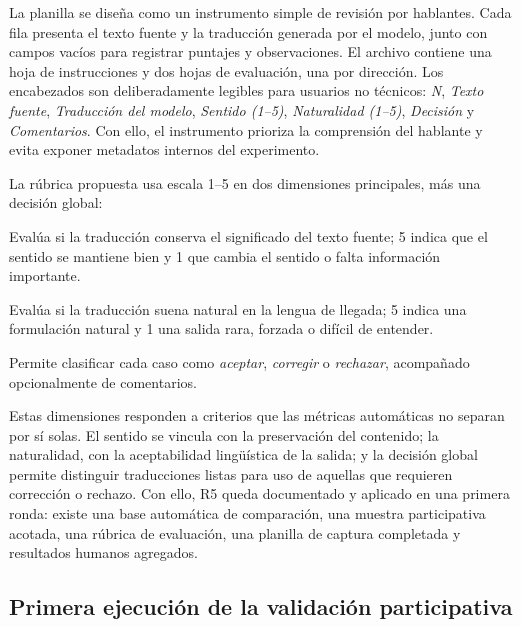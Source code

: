 \documentclass[12pt,a4paper,oneside]{book}
\begin{document}
La planilla se diseña como un instrumento simple de revisión por hablantes. Cada fila presenta el texto fuente y la traducción generada por el modelo, junto con campos vacíos para registrar puntajes y observaciones. El archivo contiene una hoja de instrucciones y dos hojas de evaluación, una por dirección. Los encabezados son deliberadamente legibles para usuarios no técnicos: \emph{N}, \emph{Texto fuente}, \emph{Traducción del modelo}, \emph{Sentido (1--5)}, \emph{Naturalidad (1--5)}, \emph{Decisión} y \emph{Comentarios}. Con ello, el instrumento prioriza la comprensión del hablante y evita exponer metadatos internos del experimento.

La rúbrica propuesta usa escala 1--5 en dos dimensiones principales, más una decisión global:

\begin{description}[leftmargin=*]
  \item[Sentido (1--5).] Evalúa si la traducción conserva el significado del texto fuente; 5 indica que el sentido se mantiene bien y 1 que cambia el sentido o falta información importante.
  \item[Naturalidad (1--5).] Evalúa si la traducción suena natural en la lengua de llegada; 5 indica una formulación natural y 1 una salida rara, forzada o difícil de entender.
  \item[Decisión.] Permite clasificar cada caso como \emph{aceptar}, \emph{corregir} o \emph{rechazar}, acompañado opcionalmente de comentarios.
\end{description}

Estas dimensiones responden a criterios que las métricas automáticas no separan por sí solas. El sentido se vincula con la preservación del contenido; la naturalidad, con la aceptabilidad lingüística de la salida; y la decisión global permite distinguir traducciones listas para uso de aquellas que requieren corrección o rechazo. Con ello, R5 queda documentado y aplicado en una primera ronda: existe una base automática de comparación, una muestra participativa acotada, una rúbrica de evaluación, una planilla de captura completada y resultados humanos agregados.

\subsection{Primera ejecución de la validación participativa}\label{validacion-participativa-ejecucion}
\end{document}
